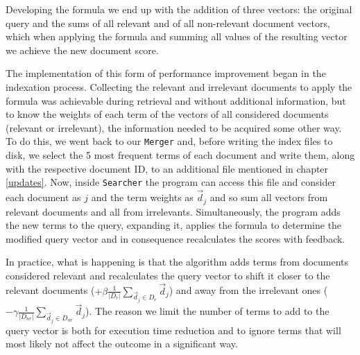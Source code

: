 \documentclass[12pt]{article}
\begin{document}
Developing the formula we end up with the addition of three vectors: 
the original query and the sums of all relevant and of all non-relevant document 
vectors, which when applying the formula and summing all values of the resulting 
vector we achieve the new document score.

\newpage
The implementation of this form of performance improvement began in the indexation
process.
Collecting the relevant and irrelevant documents to apply the formula was achievable
during retrieval and without additional information, but to know the weights of
each term of the vectors of all considered documents (relevant or irrelevant), 
the information needed to be acquired some other way.
To do this, we went back to our \texttt{Merger} and, before writing the index 
files to disk, we select the 5 most frequent terms of each document and write 
them, along with the respective document ID, to an additional file mentioned in
chapter \ref{updates}.
Now, inside \texttt{Searcher} the program can access this file and consider each
document as $j$ and the term weights as $\vec{d}_{j}$ and so sum all vectors from 
relevant documents and all from irrelevants. 
Simultaneously, the program adds the new terms to the query, expanding it, 
applies the formula to determine the modified query vector and in consequence
recalculates the scores with feedback.

In practice, what is happening is that the algorithm adds terms from documents 
considered relevant and recalculates the query vector to shift it closer to 
the relevant documents ($+ \beta \frac{1}{|D_{r}|} \sum_{ \vec{d}_{j} \in D_{r}} \vec{d}_{j}$)
and away from the irrelevant ones ($- \gamma \frac{1}{|D_{nr}|} \sum_{ \vec{d}_{j} \in D_{nr}} \vec{d}_{j}$).
The reason we limit the number of terms to add to the query vector is both for 
execution time reduction and to ignore terms that will most likely not affect the 
outcome in a significant way.
\end{document}
